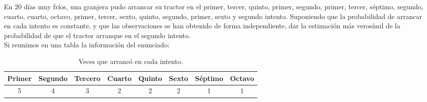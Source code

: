 \begin{ejercicio}
    En $20$ días muy fríos, una granjera pudo arrancar su tractor en el primer, tercer, quinto, primer, segundo, primer, tercer, séptimo, segundo, cuarto, cuarto, octavo, primer, tercer, sexto, quinto, segundo, primer, sexto y segundo intento. Suponiendo que la probabilidad de arrancar en cada intento es constante, y que las observaciones se han obtenido de forma independiente, dar la estimación más verosímil de la probabilidad de que el tractor arranque en el segundo intento.\\

    \noindent
    Si reunimos en una tabla la información del enunciado:
    \begin{table}[H]
    \centering
    \begin{tabular}{cccccccc}
        Primer & Segundo & Tercero & Cuarto & Quinto & Sexto & Séptimo & Octavo \\
        \hline
        5 & 4 & 3 & 2 & 2 & 2 & 1 & 1
    \end{tabular}
    \caption{Veces que arrancó en cada intento.}
    \end{table}


\end{ejercicio}
